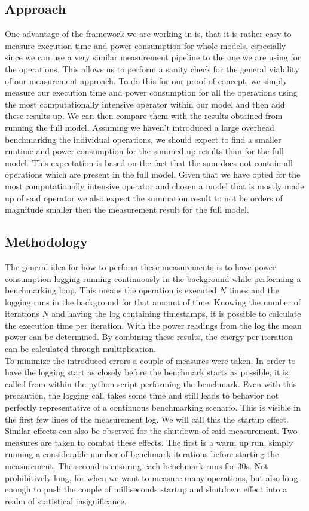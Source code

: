 \documentclass[conference]{IEEEtran}
\begin{document}
\subsection{Approach}
One advantage of the framework we are working in is, that it is rather easy to measure execution time and power consumption for whole models, especially since we can use a very similar measurement pipeline to the one we are using for the operations. This allows us to perform a sanity check for the general viability of our measurement approach. To do this for our proof of concept, we simply measure our execution time and power consumption for all the operations using the most computationally intensive operator within our model and then add these results up. We can then compare them with the results obtained from running the full model. Assuming we haven’t introduced a large overhead benchmarking the individual operations, we should expect to find a smaller runtime and power consumption for the summed up results than for the full model. This expectation is based on the fact that the sum does not contain all operations which are present in the full model. Given that we have opted for the most computationally intensive operator and chosen a model that is mostly made up of said operator we also expect the summation result to not be orders of magnitude smaller then the measurement result for the full model. 

\subsection{Methodology}
The general idea for how to perform these measurements is to have power consumption logging running continuously in the background while performing a benchmarking loop. This means the operation is executed $N$ times and the logging runs in the background for that amount of time. Knowing the number of iterations $N$ and having the log containing timestamps, it is possible to calculate the execution time per iteration. With the power readings from the log the mean power can be determined. By combining these results, the energy per iteration can be calculated through multiplication. \\
To minimize the introduced errors a couple of measures were taken. In order to have the logging start as closely before the benchmark starts as possible, it is called from within the python script performing the benchmark. Even with this precaution, the logging call takes some time and still leads to behavior not perfectly representative of a continuous benchmarking scenario. This is visible in the first few lines of the measurement log. We will call this the startup effect. Similar effects can also be observed for the shutdown of said measurement. Two measures are taken to combat these effects. The first is a warm up run, simply running a considerable number of benchmark iterations before starting the measurement. The second is ensuring each benchmark runs for 30s. Not prohibitively long, for when we want to measure many operations, but also long enough to push the couple of milliseconds startup and shutdown effect into a realm of statistical insignificance.
\end{document}
